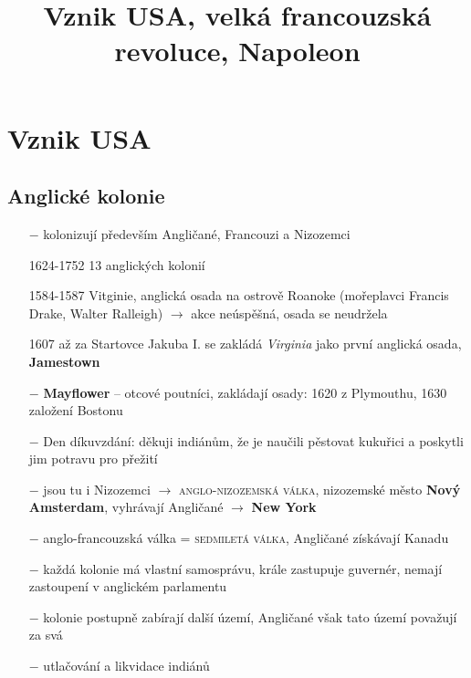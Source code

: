 \documentclass{article}
\title{\vspace{-2cm}Vznik USA, velká francouzská revoluce, Napoleon\vspace{-1.7cm}}
\date{}
\author{}
\begin{document}
\maketitle

\section*{Vznik USA}
\subsection*{Anglické kolonie}
\begin{itemize}
    \vspace{-0.5em}
    \setlength\itemsep{0.15em}
    \item[$-$] kolonizují především Angličané, Francouzi a Nizozemci
    \item[1624-1752] 13 anglických kolonií
    \item[1584-1587] Vitginie, anglická osada na ostrově Roanoke (mořeplavci Francis Drake, Walter Ralleigh) $\rightarrow$ akce neúspěšná, osada se neudržela
    \item[1607] až za Startovce Jakuba I. se zakládá \textit{Virginia} jako první anglická osada, \textbf{Jamestown}
    \item[$-$] \textbf{Mayflower} -- otcové poutníci, zakládají osady: 1620 z Plymouthu, 1630 založení Bostonu
    \item[$-$] Den díkuvzdání: děkuji indiánům, že je naučili pěstovat kukuřici a poskytli jim potravu pro přežití
    \item[$-$] jsou tu i Nizozemci $\rightarrow$ \textsc{anglo-nizozemská válka}, nizozemské město \textbf{Nový Amsterdam}, vyhrávají Angličané $\rightarrow$ \textbf{New York}
    \item[$-$] anglo-francouzská válka = \textsc{sedmiletá válka}, Angličané získávají Kanadu
    \item[$-$] každá kolonie má vlastní samosprávu, krále zastupuje guvernér, nemají zastoupení v anglickém parlamentu
    \item[$-$] kolonie postupně zabírají další území, Angličané však tato území považují za svá
    \item[$-$] utlačování a likvidace indiánů
\end{itemize}
\end{document}
